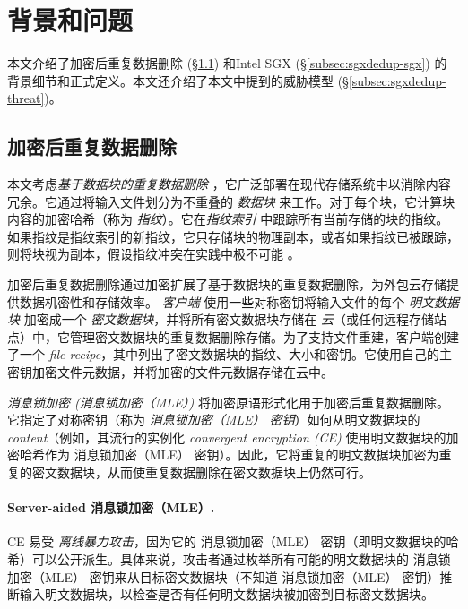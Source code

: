 \section{背景和问题}
\label{sec:sgxdedup-background}

本文介绍了加密后重复数据删除 (\S\ref{subsec:sgxdedup-encrypted-dedup}) 和Intel SGX (\S\ref{subsec:sgxdedup-sgx}) 的背景细节和正式定义。本文还介绍了本文中提到的威胁模型 (\S\ref{subsec:sgxdedup-threat})。

\subsection{加密后重复数据删除}
\label{subsec:sgxdedup-encrypted-dedup}

{\bf } 本文考虑\textit{基于数据块的重复数据删除} \cite{zhu2008avoiding,wallace12,meyer11}，它广泛部署在现代存储系统中以消除内容冗余。它通过将输入文件划分为不重叠的 \textit{数据块} 来工作。对于每个块，它计算块内容的加密哈希（称为 \textit{指纹}）。它在\textit{指纹索引} 中跟踪所有当前存储的块的指纹。如果指纹是指纹索引的新指纹，它只存储块的物理副本，或者如果指纹已被跟踪，则将块视为副本，假设指纹冲突在实践中极不可能 \cite{black2006compare}。
   
加密后重复数据删除通过加密扩展了基于数据块的重复数据删除，为外包云存储提供数据机密性和存储效率。 \textit{ 客户端} 使用一些对称密钥将输入文件的每个 \textit{ 明文数据块} 加密成一个 \textit{ 密文数据块}，并将所有密文数据块存储在 \textit{ 云}（或任何远程存储站点）中，它管理密文数据块的重复数据删除存储。为了支持文件重建，客户端创建了一个 \textit{ file recipe}，其中列出了密文数据块的指纹、大小和密钥。它使用自己的主密钥加密文件元数据，并将加密的文件元数据存储在云中。

\textit{ 消息锁加密 (消息锁加密（MLE）)} \cite{bellare2013MLE} 将加密原语形式化用于加密后重复数据删除。它指定了对称密钥（称为 \textit{ 消息锁加密（MLE） 密钥}）如何从明文数据块的 \textit{ content}（例如，其流行的实例化 \textit{ convergent encryption (CE)} \cite{douceur02}使用明文数据块的加密哈希作为 消息锁加密（MLE） 密钥）。因此，它将重复的明文数据块加密为重复的密文数据块，从而使重复数据删除在密文数据块上仍然可行。

\paragraph*{Server-aided 消息锁加密（MLE）.} CE 易受 \textit{ 离线暴力攻击}，因为它的 消息锁加密（MLE） 密钥（即明文数据块的哈希）可以公开派生。具体来说，攻击者通过枚举所有可能的明文数据块的 消息锁加密（MLE） 密钥来从目标密文数据块（不知道 消息锁加密（MLE） 密钥）推断输入明文数据块，以检查是否有任何明文数据块被加密到目标密文数据块。

